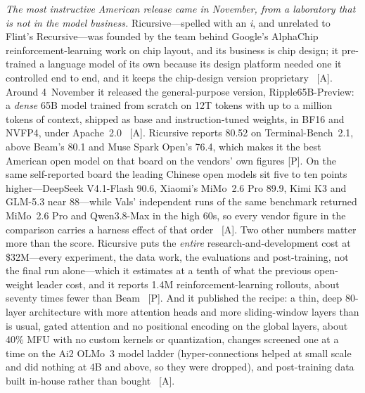 \emph{The most instructive American release came in November, from a laboratory that is not in the model business.} Ricursive---spelled with an \emph{i}, and unrelated to Flint's Recursive---was founded by the team behind Google's AlphaChip reinforcement-learning work on chip layout, and its business is chip design; it pre-trained a language model of its own because its design platform needed one it controlled end to end, and it keeps the chip-design version proprietary~\cite{lit-ripple,lit-witteveen-ripple} [A]. Around 4~November it released the general-purpose version, Ripple65B-Preview: a \emph{dense} 65B model trained from scratch on 12T tokens with up to a million tokens of context, shipped as base and instruction-tuned weights, in BF16 and NVFP4, under Apache~2.0~\cite{lit-ripple,lit-witteveen-ripple} [A]. Ricursive reports 80.52 on Terminal-Bench~2.1, above Beam's 80.1 and Muse Spark Open's 76.4, which makes it the best American open model on that board on the vendors' own figures [P]. On the same self-reported board the leading Chinese open models sit five to ten points higher---DeepSeek V4.1-Flash 90.6, Xiaomi's MiMo~2.6 Pro 89.9, Kimi K3 and GLM-5.3 near 88---while Vals' independent runs of the same benchmark returned MiMo~2.6 Pro and Qwen3.8-Max in the high 60s, so every vendor figure in the comparison carries a harness effect of that order~\cite{lit-witteveen-ripple} [A]. Two other numbers matter more than the score. Ricursive puts the \emph{entire} research-and-development cost at \$32M---every experiment, the data work, the evaluations and post-training, not the final run alone---which it estimates at a tenth of what the previous open-weight leader cost, and it reports 1.4M reinforcement-learning rollouts, about seventy times fewer than Beam~\cite{lit-ripple,lit-witteveen-ripple} [P]. And it published the recipe: a thin, deep 80-layer architecture with more attention heads and more sliding-window layers than is usual, gated attention and no positional encoding on the global layers, about 40\% MFU with no custom kernels or quantization, changes screened one at a time on the Ai2 OLMo~3 model ladder (hyper-connections helped at small scale and did nothing at 4B and above, so they were dropped), and post-training data built in-house rather than bought~\cite{lit-witteveen-ripple} [A].

